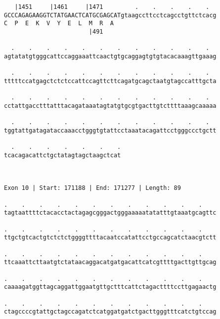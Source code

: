 \documentclass{article}
\begin{document}
\begin{Verbatim}
   |1451     |1461     |1471         .    .    .    .    .  
GCCCAGAGAAGGTCTATGAACTCATGCGAGCATgtaagccttcctcagcctgttctcacg
C  P  E  K  V  Y  E  L  M  R  A                             
                        |491                                
  
  .    .    .    .    .    .    .    .    .    .    .    .  
agtatatgtgggcattccaggaaattcaactgtgcaggagtgtgtacacaaagttgaaag
                                                            
  .    .    .    .    .    .    .    .    .    .    .    .  
tttttccatgagctctctccattccagttcttcagatgcagctaatgtagccatttgcta
                                                            
  .    .    .    .    .    .    .    .    .    .    .    .  
cctattgacctttatttacagataaatagtatgtgcgtgacttgtcttttaaagcaaaaa
                                                            
  .    .    .    .    .    .    .    .    .    .    .    .  
tggtattgatagataccaaacctgggtgtattcctaaatacagattcctgggccctgctt
                                                            
  .    .    .    .    .    .    .
tcacagacattctgctatagtagctaagctcat
                                 
                                 
 
Exon 10 | Start: 171188 | End: 171277 | Length: 89
 
.    .    .    .    .    .    .    .    .    .    .    .    
tagtaattttctacacctactagagcgggactgggaaaaatatatttgtaaatgcagttc
                                                            
.    .    .    .    .    .    .    .    .    .    .    .    
ttgctgtcactgtctctctggggttttacaatccatattcctgccagcatctaacgtctt
                                                            
.    .    .    .    .    .    .    .    .    .    .    .    
ttcaaattcttaatgtctataacaggacatgatgacattcatcgttttgacttgttgcag
                                                            
.    .    .    .    .    .    .    .    .    .    .    .    
caaaagatggttagcaggattggaatgttgctttcattctagacttttccttgagaactg
                                                            
.    .    .    .    .    .    .    .    .    .    .    .    
ctagccccgtattgctagccagatctcatggatgatctgacttgggtttcatctgtccag
                                                            

\end{Verbatim}
\end{document}
